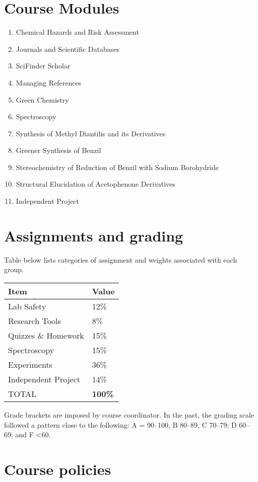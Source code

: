 \hypertarget{course-modules}{%
\section{Course Modules}\label{course-modules}}

\begin{enumerate}
\def\labelenumi{\arabic{enumi}.}
\tightlist
\item
  Chemical Hazards and Risk Assessment
\item
  Journals and Scientific Databases
\item
  SciFinder Scholar
\item
  Managing References
\item
  Green Chemistry
\item
  Spectroscopy
\item
  Synthesis of Methyl Diantilis and its Derivatives
\item
  Greener Synthesis of Benzil\\
\item
  Stereochemistry of Reduction of Benzil with Sodium Borohydride
\item
  Structural Elucidation of Acetophenone Derivatives
\item
  Independent Project
\end{enumerate}

\hypertarget{assignments-and-grading}{%
\section{Assignments and grading}\label{assignments-and-grading}}

Table below lists categories of assignment and weights associated with
each group.

\begin{longtable}[]{@{}ll@{}}
\toprule
Item & Value\tabularnewline
\midrule
\endhead
Lab Safety & 12\%\tabularnewline
Research Tools & 8\%\tabularnewline
Quizzes \& Homework & 15\%\tabularnewline
Spectroscopy & 15\%\tabularnewline
Experiments & 36\%\tabularnewline
Independent Project & 14\%\tabularnewline
TOTAL & \textbf{100\%}\tabularnewline
\bottomrule
\end{longtable}

Grade brackets are imposed by course coordinator. In the past, the
grading scale followed a pattern close to the following: A = 90--100, B
80--89, C 70--79; D 60--69; and F \textless60.

\hypertarget{course-policies}{%
\section{Course policies}\label{course-policies}}

